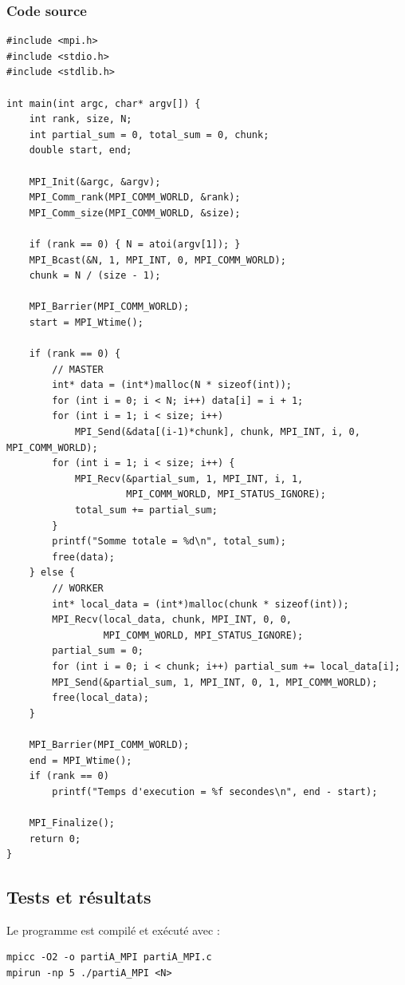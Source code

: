 \documentclass[12pt, a4paper]{article}
\begin{document}
\subsubsection{Code source}

\begin{lstlisting}[caption={partiA\_MPI.c -- Modèle Master/Worker MPI}, label={lst:partieA}]
#include <mpi.h>
#include <stdio.h>
#include <stdlib.h>

int main(int argc, char* argv[]) {
    int rank, size, N;
    int partial_sum = 0, total_sum = 0, chunk;
    double start, end;

    MPI_Init(&argc, &argv);
    MPI_Comm_rank(MPI_COMM_WORLD, &rank);
    MPI_Comm_size(MPI_COMM_WORLD, &size);

    if (rank == 0) { N = atoi(argv[1]); }
    MPI_Bcast(&N, 1, MPI_INT, 0, MPI_COMM_WORLD);
    chunk = N / (size - 1);

    MPI_Barrier(MPI_COMM_WORLD);
    start = MPI_Wtime();

    if (rank == 0) {
        // MASTER
        int* data = (int*)malloc(N * sizeof(int));
        for (int i = 0; i < N; i++) data[i] = i + 1;
        for (int i = 1; i < size; i++)
            MPI_Send(&data[(i-1)*chunk], chunk, MPI_INT, i, 0, MPI_COMM_WORLD);
        for (int i = 1; i < size; i++) {
            MPI_Recv(&partial_sum, 1, MPI_INT, i, 1,
                     MPI_COMM_WORLD, MPI_STATUS_IGNORE);
            total_sum += partial_sum;
        }
        printf("Somme totale = %d\n", total_sum);
        free(data);
    } else {
        // WORKER
        int* local_data = (int*)malloc(chunk * sizeof(int));
        MPI_Recv(local_data, chunk, MPI_INT, 0, 0,
                 MPI_COMM_WORLD, MPI_STATUS_IGNORE);
        partial_sum = 0;
        for (int i = 0; i < chunk; i++) partial_sum += local_data[i];
        MPI_Send(&partial_sum, 1, MPI_INT, 0, 1, MPI_COMM_WORLD);
        free(local_data);
    }

    MPI_Barrier(MPI_COMM_WORLD);
    end = MPI_Wtime();
    if (rank == 0)
        printf("Temps d'execution = %f secondes\n", end - start);

    MPI_Finalize();
    return 0;
}
\end{lstlisting}

\subsection{Tests et résultats}

Le programme est compilé et exécuté avec :
\begin{verbatim}
mpicc -O2 -o partiA_MPI partiA_MPI.c
mpirun -np 5 ./partiA_MPI <N>
\end{verbatim}
\end{document}

